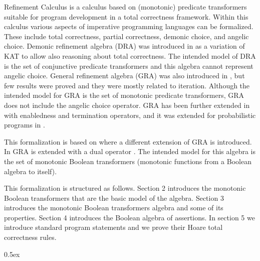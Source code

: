 \documentclass[11pt,a4paper]{article}
\begin{document}
Refinement Calculus \cite{back-1978,back-1980,back-wright-98,morgan-90} is a 
calculus based on (monotonic) predicate transformers suitable for program 
development in a total correctness framework. Within this calculus various 
aspects of imperative programming languages can be formalized. These include 
total correctness, partial correctness, demonic choice, and angelic choice. 
Demonic refinement algebra (DRA) was introduced in 
\cite{vonwright:2002,vonwright:2004} as a variation of KAT to allow also reasoning 
about total correctness. The intended model of DRA is the set of conjunctive 
predicate transformers and this algebra cannot represent angelic choice. 
General refinement algebra (GRA) was also introduced in \cite{vonwright:2004}, 
but few results were proved and they were mostly related to iteration. 
Although the intended model for GRA is the set of monotonic predicate 
transformers, GRA does not include the angelic choice operator. GRA has 
been further extended in \cite{solin:vonwright:2009} with enabledness and 
termination operators, and it was extended for probabilistic programs in 
\cite{meinicke:solin:2010}.

This formalization is based on \cite{preoteasa:2011c} where a different
extension of GRA is introduced. In \cite{preoteasa:2011c}  GRA 
is extended with a dual operator 
\cite{guerreiro:82,back:vonwright:1989,back:vonwright:1990,back-wright-98}. 
The intended model for this algebra is the set of monotonic Boolean transformers 
(monotonic functions from a Boolean algebra to itself). 

This formalization is structured as follows. Section 2 introduces the monotonic 
Boolean transformers that are the basic model of the algebra. Section 3 introduces 
the monotonic Boolean transformers algebra and some of its properties. 
Section 4 introduces the Boolean algebra of assertions. In section
5 we introduce standard program statements and we prove their Hoare 
total correctness rules.


\parindent 0pt\parskip 0.5ex





\end{document}

